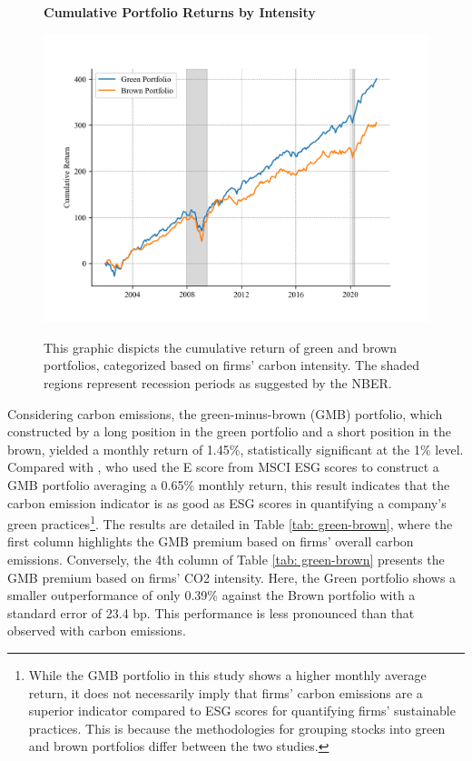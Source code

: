 \documentclass[12pt]{article}
\begin{document}
\begin{figure}[!ht]
\centering
\caption{\textbf{Cumulative Portfolio Returns by Intensity}}
\includegraphics{graphics/green_brown_int.png}
\label{fig: cum_ret_2}
\caption*{\footnotesize{This graphic dispicts the cumulative return of green and brown portfolios, categorized based on firms' carbon intensity. The shaded regions represent recession periods as suggested by the NBER.}}
\end{figure}

Considering carbon emissions, the green-minus-brown (GMB) portfolio, which constructed by a long position in the green portfolio and a short position in the brown, yielded a monthly return of 1.45\%, statistically significant at the 1\% level. Compared with \citet{pastor2022dissecting}, who used the E score from MSCI ESG scores to construct a GMB portfolio averaging a 0.65\% monthly return, this result indicates that the carbon emission indicator is as good as ESG scores in quantifying a company's green practices\footnote{While the GMB portfolio in this study shows a higher monthly average return, it does not necessarily imply that firms' carbon emissions are a superior indicator compared to ESG scores for quantifying firms' sustainable practices. This is because the methodologies for grouping stocks into green and brown portfolios differ between the two studies.}. The results are detailed in Table \ref{tab: green-brown}, where the first column highlights the GMB premium based on firms' overall carbon emissions. Conversely, the 4th column of Table \ref{tab: green-brown} presents the GMB premium based on firms' CO2 intensity. Here, the Green portfolio shows a smaller outperformance of only 0.39\% against the Brown portfolio with a standard error of 23.4 bp. This performance is less pronounced than that observed with carbon emissions.
\end{document}

